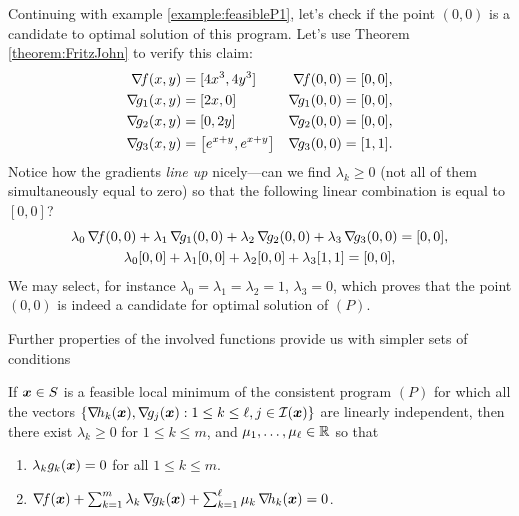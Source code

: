 \begin{example}
Continuing with example \ref{example:feasibleP1}, let's check if the point $(0,0)$ is a candidate to optimal solution of this program.  Let's use Theorem \ref{theorem:FritzJohn} to verify this claim:
\begin{align*}
\gradient{f}(x,y) &= [ 4x^3, 4y^3 ] &\gradient{f}(0,0) &= [0,0], \\
\gradient{g_1}(x,y) &= [ 2x, 0 ] &\gradient{g_1}(0,0) &= [0,0], \\
\gradient{g_2}(x,y) &= [0, 2y] &\gradient{g_2}(0,0) &= [0,0], \\
\gradient{g_3}(x,y) &= \big[e^{x+y}, e^{x+y} \big] &\gradient{g_3}(0,0) &= [1,1].
\end{align*}
Notice how the gradients \emph{line up} nicely---can we find $\lambda_k \geq 0$ (not all of them simultaneously equal to zero) so that the following linear combination is equal to $[0,0]$?
\begin{gather*}
\lambda_0\mathop{\nabla\! {f}}(0,0) + \lambda_1 \mathop{\nabla\! {g_1}}(0,0) + \lambda_2 \mathop{\nabla\! {g_2}}(0,0) + \lambda_3 \mathop{\nabla\! {g_3}}(0,0) = [0,0], \\
\lambda_0[0,0] + \lambda_1[0,0] + \lambda_2[0,0] + \lambda_3[1,1] = [0,0],
\end{gather*}
We may select, for instance $\lambda_0=\lambda_1=\lambda_2=1$, $\lambda_3=0$, which proves that the point $(0,0)$ is indeed a candidate for optimal solution of $(P)$.
\end{example}

\separator
Further properties of the involved functions provide us with simpler sets of conditions

\begin{theorem}\label{theorem:KKTnecessary}
If $\boldsymbol{x} \in S$ is a feasible local minimum of the consistent program $(P)$ for which all the vectors $\{ \mathop{\nabla\! {h_k}}(\boldsymbol{x}), \mathop{\nabla\! {g_j}}(\boldsymbol{x}) : 1 \leq k \leq \ell, j \in \mathcal{I}(\boldsymbol{x}) \}$ are linearly independent, then there exist $\lambda_k \geq 0$ for $1\leq k \leq m$, and $\mu_1, \dots, \mu_\ell \in \mathbb{R}$ so that
\begin{enumerate}
 	\item\label{item:KKTnecessary1} $\lambda_k g_k(\boldsymbol{x}) = 0$ for all $1 \leq k \leq m$.
 	\item\label{item:KKTnecessary2} $\mathop{\nabla\! {f}}(\boldsymbol{x}) + \sum_{k=1}^m \lambda_k \mathop{\nabla\! {g_k}}(\boldsymbol{x}) + \sum_{k=1}^\ell \mu_k \mathop{\nabla\! {h_k}}(\boldsymbol{x}) = 0$.
 \end{enumerate}
\end{theorem}

